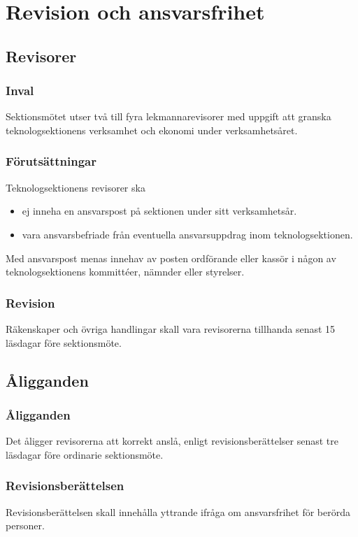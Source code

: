 \section{Revision och ansvarsfrihet}

\subsection{Revisorer}

\subsubsection{Inval}
Sektionsmötet utser två till fyra lekmannarevisorer med uppgift att granska teknologsektionens verksamhet och ekonomi under verksamhetsåret.

\subsubsection{Förutsättningar}
Teknologsektionens revisorer ska 
\begin{itemize}
    \item ej inneha en ansvarspost på sektionen under sitt verksamhetsår.
    \item vara ansvarsbefriade från eventuella ansvarsuppdrag inom teknologsektionen. 
\end{itemize} 

Med ansvarspost menas innehav av posten ordförande eller kassör i någon av teknologsektionens kommittéer, nämnder eller styrelser.

\subsubsection{Revision}
Räkenskaper och övriga handlingar skall vara revisorerna tillhanda senast 15 läsdagar före sektionsmöte.

\subsection{Åligganden}

\subsubsection{Åligganden}
Det åligger revisorerna att korrekt anslå, enligt  revisionsberättelser senast tre läsdagar före ordinarie sektionsmöte.

\subsubsection{Revisionsberättelsen}
Revisionsberättelsen skall innehålla yttrande ifråga om ansvarsfrihet för berörda personer.

